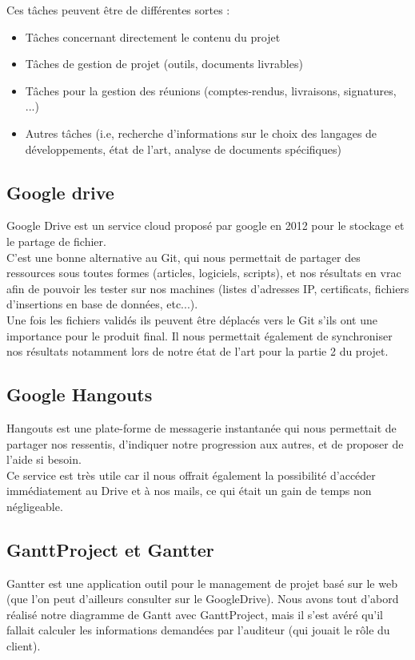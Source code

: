 Ces tâches peuvent être de différentes sortes :
\begin{itemize}
\item Tâches concernant directement le contenu du projet
\item Tâches de gestion de projet (outils, documents livrables)
\item Tâches pour la gestion des réunions (comptes-rendus, livraisons, signatures, ...)
\item Autres tâches (i.e, recherche d'informations sur le choix des langages de développements, état de l'art, analyse de documents spécifiques)
\end{itemize}

\subsection{Google drive}

Google Drive est un service cloud proposé par google en 2012 pour le stockage et le partage de fichier.\\
C'est une bonne alternative au Git, qui nous permettait de partager des ressources sous toutes formes (articles, logiciels, scripts), et nos résultats en vrac afin de pouvoir les tester sur nos machines (listes d'adresses IP, certificats, fichiers d'insertions en base de données, etc...).\\
Une fois les fichiers validés ils peuvent être déplacés vers le Git s'ils ont une importance pour le produit final. Il nous permettait également de synchroniser nos résultats notamment lors de notre état de l'art pour la partie 2 du projet.

\subsection{Google Hangouts}

Hangouts est une plate-forme de messagerie instantanée qui nous permettait de partager nos ressentis, d'indiquer notre progression aux autres, et de proposer de l'aide si besoin.\\
Ce service est très utile car il nous offrait également la possibilité d'accéder immédiatement au Drive et à nos mails, ce qui était un gain de temps non négligeable.

\subsection{GanttProject et Gantter}

Gantter \cite{gantter} est une application outil pour le management de projet basé sur le web (que l'on peut d'ailleurs consulter sur le GoogleDrive).
Nous avons tout d'abord réalisé notre diagramme de Gantt avec GanttProject, mais il s'est avéré qu'il fallait calculer les informations demandées par l'auditeur (qui jouait le rôle du client).\\

